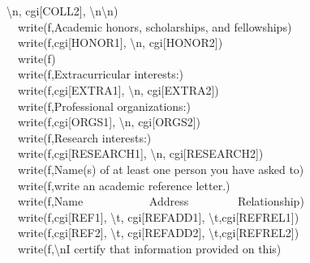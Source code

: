 {{\textquotedbl}{\textbackslash}n{\textquotedbl},
cgi[{\textquotedbl}COLL2{\textquotedbl}],
{\textquotedbl}{\textbackslash}n{\textbackslash}n{\textquotedbl}) \\
\ \ write(f,{\textquotedbl}Academic honors, scholarships, and
fellowships{\textquotedbl}) \\
\ \ write(f,cgi[{\textquotedbl}HONOR1{\textquotedbl}],
{\textquotedbl}{\textbackslash}n{\textquotedbl},
cgi[{\textquotedbl}HONOR2{\textquotedbl}]) \\
\ \ write(f) \\
\ \ write(f,{\textquotedbl}Extracurricular interests:{\textquotedbl}) \\
\ \ write(f,cgi[{\textquotedbl}EXTRA1{\textquotedbl}],
{\textquotedbl}{\textbackslash}n{\textquotedbl},
cgi[{\textquotedbl}EXTRA2{\textquotedbl}]) \\
\ \ write(f,{\textquotedbl}Professional organizations:{\textquotedbl}) \\
\ \ write(f,cgi[{\textquotedbl}ORGS1{\textquotedbl}],
{\textquotedbl}{\textbackslash}n{\textquotedbl},
cgi[{\textquotedbl}ORGS2{\textquotedbl}]) \\
\ \ write(f,{\textquotedbl}Research interests:{\textquotedbl}) \\
\ \ write(f,cgi[{\textquotedbl}RESEARCH1{\textquotedbl}],
{\textquotedbl}{\textbackslash}n{\textquotedbl},
cgi[{\textquotedbl}RESEARCH2{\textquotedbl}]) \\
\ \ write(f,{\textquotedbl}Name(s) of at least one person you have asked
to{\textquotedbl}) \\
\ \ write(f,{\textquotedbl}write an academic reference
letter.{\textquotedbl}) \\
\ \ write(f,{\textquotedbl}Name \ \ \ \ \ \ \ \ \ \ \ Address
\ \ \ \ \ \ \ \ Relationship{\textquotedbl}) \\
\ \ write(f,cgi[{\textquotedbl}REF1{\textquotedbl}],
{\textquotedbl}{\textbackslash}t{\textquotedbl},
cgi[{\textquotedbl}REFADD1{\textquotedbl}],
{\textquotedbl}{\textbackslash}t{\textquotedbl},cgi[{\textquotedbl}REFREL1{\textquotedbl}]) \\
\ \ write(f,cgi[{\textquotedbl}REF2{\textquotedbl}],
{\textquotedbl}{\textbackslash}t{\textquotedbl},
cgi[{\textquotedbl}REFADD2{\textquotedbl}],
{\textquotedbl}{\textbackslash}t{\textquotedbl},cgi[{\textquotedbl}REFREL2{\textquotedbl}]) \\
\ \ write(f,{\textquotedbl}{\textbackslash}nI certify that information
provided on this{\textquotedbl}) \\
}
